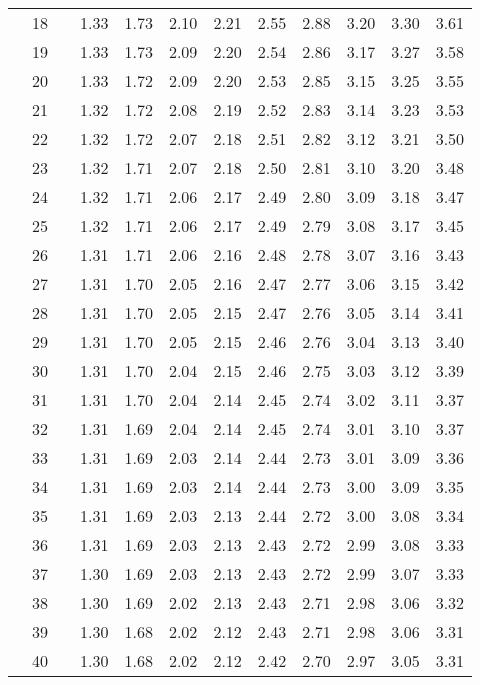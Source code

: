 \documentclass[12pt,letterpaper]{article}
\begin{document}
\begin{center}
\begin{tabular}{|l r | l c c c c c c c c c|}
&18&& 1.33 & 1.73 & 2.10 & 2.21 & 2.55 & 2.88 & 3.20 & 3.30 & 3.61\\ 
&19&& 1.33 & 1.73 & 2.09 & 2.20 & 2.54 & 2.86 & 3.17 & 3.27 & 3.58\\ 
&20&& 1.33 & 1.72 & 2.09 & 2.20 & 2.53 & 2.85 & 3.15 & 3.25 & 3.55\\ 
&21&& 1.32 & 1.72 & 2.08 & 2.19 & 2.52 & 2.83 & 3.14 & 3.23 & 3.53\\ 
&22&& 1.32 & 1.72 & 2.07 & 2.18 & 2.51 & 2.82 & 3.12 & 3.21 & 3.50\\ 
&23&& 1.32 & 1.71 & 2.07 & 2.18 & 2.50 & 2.81 & 3.10 & 3.20 & 3.48\\ 
&24&& 1.32 & 1.71 & 2.06 & 2.17 & 2.49 & 2.80 & 3.09 & 3.18 & 3.47\\ 
&25&& 1.32 & 1.71 & 2.06 & 2.17 & 2.49 & 2.79 & 3.08 & 3.17 & 3.45\\ 
&26&& 1.31 & 1.71 & 2.06 & 2.16 & 2.48 & 2.78 & 3.07 & 3.16 & 3.43\\ 
&27&& 1.31 & 1.70 & 2.05 & 2.16 & 2.47 & 2.77 & 3.06 & 3.15 & 3.42\\ 
&28&& 1.31 & 1.70 & 2.05 & 2.15 & 2.47 & 2.76 & 3.05 & 3.14 & 3.41\\ 
&29&& 1.31 & 1.70 & 2.05 & 2.15 & 2.46 & 2.76 & 3.04 & 3.13 & 3.40\\ 
&30&& 1.31 & 1.70 & 2.04 & 2.15 & 2.46 & 2.75 & 3.03 & 3.12 & 3.39\\ 
&31&& 1.31 & 1.70 & 2.04 & 2.14 & 2.45 & 2.74 & 3.02 & 3.11 & 3.37\\ 
&32&& 1.31 & 1.69 & 2.04 & 2.14 & 2.45 & 2.74 & 3.01 & 3.10 & 3.37\\ 
&33&& 1.31 & 1.69 & 2.03 & 2.14 & 2.44 & 2.73 & 3.01 & 3.09 & 3.36\\ 
&34&& 1.31 & 1.69 & 2.03 & 2.14 & 2.44 & 2.73 & 3.00 & 3.09 & 3.35\\ 
&35&& 1.31 & 1.69 & 2.03 & 2.13 & 2.44 & 2.72 & 3.00 & 3.08 & 3.34\\ 
&36&& 1.31 & 1.69 & 2.03 & 2.13 & 2.43 & 2.72 & 2.99 & 3.08 & 3.33\\ 
&37&& 1.30 & 1.69 & 2.03 & 2.13 & 2.43 & 2.72 & 2.99 & 3.07 & 3.33\\ 
&38&& 1.30 & 1.69 & 2.02 & 2.13 & 2.43 & 2.71 & 2.98 & 3.06 & 3.32\\ 
&39&& 1.30 & 1.68 & 2.02 & 2.12 & 2.43 & 2.71 & 2.98 & 3.06 & 3.31\\ 
&40&& 1.30 & 1.68 & 2.02 & 2.12 & 2.42 & 2.70 & 2.97 & 3.05 & 3.31\\ 
 
  \hline
\end{tabular}


\end{center}
\end{document}
